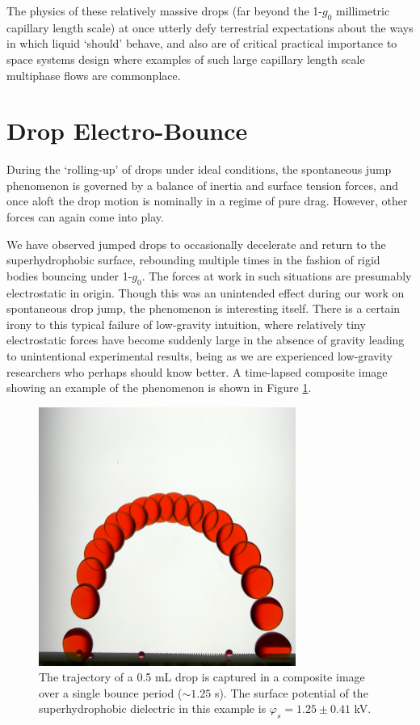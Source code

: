 \documentclass[12pt,a4paper,oneside]{book}
\begin{document}
The physics of these relatively massive drops (far beyond the 1-$g_0$ millimetric capillary length scale) at once utterly defy terrestrial expectations about the ways in which liquid `should' behave, and also are of critical practical importance to space systems design where examples of such large capillary length scale multiphase flows are commonplace.

\section{Drop Electro-Bounce}
During the `rolling-up' of drops under ideal conditions, the spontaneous jump phenomenon is governed by a balance of inertia and surface tension forces, and once aloft the drop motion is nominally in a regime of pure drag. However, other forces can again come into play. 

We have observed jumped drops to occasionally decelerate and return to the superhydrophobic surface, rebounding multiple times in the fashion of rigid bodies bouncing under 1-$g_0$. The forces at work in such situations are presumably electrostatic in origin. Though this was an unintended effect during our work on spontaneous drop jump, the phenomenon is interesting itself. There is a certain irony to this typical failure of low-gravity intuition, where relatively tiny electrostatic forces have become suddenly large in the absence of gravity leading to unintentional experimental results, being as we are experienced low-gravity researchers who perhaps should know better. A time-lapsed composite image showing an example of the phenomenon is shown in Figure \ref{fig:bounce}.
\begin{figure}[htb]
\centering
\includegraphics[width=0.75\textwidth]{bounce}
\caption{The trajectory of a 0.5 mL drop is captured in a composite image over a single bounce period ($\sim 1.25$ s). The surface potential of the superhydrophobic dielectric in this example is $\varphi_s = 1.25 \pm 0.41$ kV. \label{fig:bounce}}
\end{figure}
\end{document}
